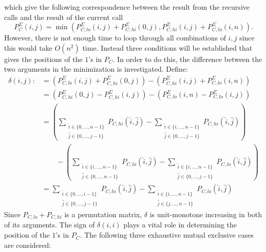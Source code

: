 \documentclass[twoside,11pt,openright]{report}
\begin{document}
which give the following correspondence between the result from the recursive calls and the result of the current call
\[
  P_C^{\Sigma}(i, j) = \min\left( P_{C,lo}^{\Sigma}(i, j) + P_{C,hi}^{\Sigma}(0, j),
                                  P_{C,hi}^{\Sigma}(i, j) + P_{C,lo}^{\Sigma}(i, n)
                            \right).
\]
However, there is not enough time to loop through all combinations of $i,j$ since this would take $O(n^2)$ time. Instead three conditions will be established that gives the positions of the $1$'s in $P_C$. In order to do this, the difference between the two arguments in the minimization is investigated. Define:
\begin{align*}
  \delta(i, j) :&= \left( P_{C,lo}^{\Sigma}(i, j) + P_{C,hi}^{\Sigma}(0, j) \right) - \left( P_{C,hi}^{\Sigma}(i, j) + P_{C,lo}^{\Sigma}(i, n) \right) \\
    &= \left( P_{C,hi}^{\Sigma}(0, j) - P_{C,hi}^{\Sigma}(i, j) \right) - \left( P_{C,lo}^{\Sigma}(i, n) - P_{C,lo}^{\Sigma}(i, j) \right) \\
    &= \left( \sum_{\substack{\hat{i} \in \{0, \dots, n - 1\} \\ \hat{j} \in \{0, \dots, j - 1\}}} P_{C,hi}(\hat{i}, \hat{j}) - \sum_{\substack{\hat{i} \in \{i, \dots, n - 1\} \\ \hat{j} \in \{0, \dots, j - 1\}}} P_{C,hi}(\hat{i}, \hat{j}) \right) \\ &\quad\quad- \left( \sum_{\substack{\hat{i} \in \{i, \dots, n - 1\} \\ \hat{j} \in \{0, \dots, n - 1\}}} P_{C,lo}(\hat{i}, \hat{j}) - \sum_{\substack{\hat{i} \in \{i, \dots, n - 1\} \\ \hat{j} \in \{0, \dots, j - 1\}}} P_{C,lo}(\hat{i}, \hat{j}) \right) \\
    &= \sum_{\substack{\hat{i} \in \{0, \dots, i - 1\} \\ \hat{j} \in \{0, \dots, j - 1\}}} P_{C,hi}(\hat{i}, \hat{j}) - \sum_{\substack{\hat{i} \in \{i, \dots, n - 1\} \\ \hat{j} \in \{j, \dots, n - 1\}}} P_{C,lo}(\hat{i}, \hat{j})
\end{align*}
Since $P_{C,lo} + P_{C,hi}$ is a permutation matrix, $\delta$ is unit-monotone increasing in both of its arguments. The sign of $\delta(i, i)$ plays a vital role in determining the position of the $1$'s in $P_C$. The following three exhaustive mutual exclusive cases are considered:
\end{document}
